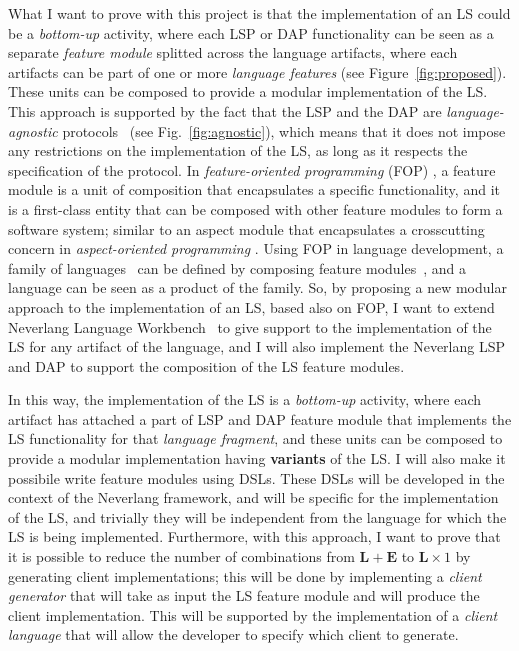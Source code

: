 What I want to prove with this project is that the implementation of an LS could be a \textit{bottom-up} activity, where each LSP or DAP functionality can be seen as a separate \textit{feature module} \cite{Batory04, Kastner11} splitted across the language artifacts, where each artifacts can be part of one or more \textit{language features} (see Figure~\ref{fig:proposed}). These units can be composed to provide a modular implementation of the LS. This approach is supported by the fact that the LSP and the DAP are \textit{language-agnostic} protocols~\cite{Niephaus20, Rodriguez-Echeverria18} (see Fig.~\ref{fig:agnostic}), which means that it does not impose any restrictions on the implementation of the LS, as long as it respects the specification of the protocol.
In \textit{feature-oriented programming} (FOP) \cite{Apel13, Czarnecki04, Prehofer01}, a feature module is a unit of composition that encapsulates a specific functionality, and it is a first-class entity that can be composed with other feature modules to form a software system; similar to an aspect module that encapsulates a crosscutting concern in \textit{aspect-oriented programming} \cite{Kiczales01, Kiczales97, Laddad03}. Using FOP in language development, a family of languages~\cite{Liebig13} can be defined by composing feature modules~\cite{Wende09}, and a language can be seen as a product of the family.
So, by proposing a new modular approach to the implementation of an LS, based also on FOP, I want to extend Neverlang Language Workbench~\cite{Cazzola15c, Cazzola14c} to give support to the implementation of the LS for any artifact of the language, and I will also implement the Neverlang LSP~\cite{Cazzola19} and DAP to support the composition of the LS feature modules.

In this way, the implementation of the LS is a \textit{bottom-up} activity, where each artifact has attached a part of LSP and DAP feature module that implements the LS functionality for that \textit{language fragment}, and these units can be composed to provide a modular implementation having \textbf{variants} of the LS.
I will also make it possibile write feature modules using DSLs.
These DSLs will be developed in the context of the Neverlang framework, and will be specific for the implementation of the LS, and trivially they will be independent from the language for which the LS is being implemented.
Furthermore, with this approach, I want to prove that it is possible to reduce the number of combinations from $\mathbf{L} + \mathbf{E}$ to $\mathbf{L} \times 1$ by generating client implementations; this will be done by implementing a \textit{client generator} that will take as input the LS feature module and will produce the client implementation. This will be supported by the implementation of a \textit{client language} that will allow the developer to specify which client to generate.

